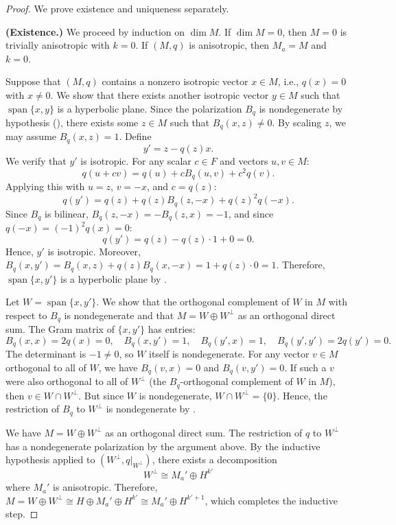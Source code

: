 \begin{proof}
    We prove existence and uniqueness separately.

    \textbf{(Existence.)} We proceed by induction on $\dim M$. If $\dim M = 0$, then $M = 0$ is trivially anisotropic with $k = 0$. If $(M, q)$ is anisotropic, then $M_a = M$ and $k = 0$.

    Suppose that $(M, q)$ contains a nonzero isotropic vector $x \in M$, i.e., $q(x) = 0$ with $x \neq 0$. We show that there exists another isotropic vector $y \in M$ such that $\operatorname{span}\{x, y\}$ is a hyperbolic plane. Since the polarization $B_q$ is nondegenerate by hypothesis (), there exists some $z \in M$ such that $B_q(x, z) \neq 0$. By scaling $z$, we may assume $B_q(x, z) = 1$. Define
    $$y' = z - q(z)x.$$
    We verify that $y'$ is isotropic. For any scalar $c \in F$ and vectors $u, v \in M$:
    $$q(u + cv) = q(u) + c B_q(u,v) + c^2 q(v).$$
    Applying this with $u = z$, $v = -x$, and $c = q(z)$:
    $$q(y') = q(z) + q(z) B_q(z, -x) + q(z)^2 q(-x).$$
    Since $B_q$ is bilinear, $B_q(z, -x) = -B_q(z, x) = -1$, and since $q(-x) = (-1)^2 q(x) = 0$:
    $$q(y') = q(z) - q(z) \cdot 1 + 0 = 0.$$
    Hence, $y'$ is isotropic. Moreover, $B_q(x, y') = B_q(x, z) + q(z) B_q(x, -x) = 1 + q(z) \cdot 0 = 1$. Therefore, $\operatorname{span}\{x, y'\}$ is a hyperbolic plane by .

    Let $W = \operatorname{span}\{x, y'\}$. We show that the orthogonal complement of $W$ in $M$ with respect to $B_q$ is nondegenerate and that $M = W \oplus W^{\perp}$ as an orthogonal direct sum. The Gram matrix of $\{x, y'\}$ has entries:
    $$B_q(x, x) = 2q(x) = 0, \quad B_q(x, y') = 1, \quad B_q(y', x) = 1, \quad B_q(y', y') = 2q(y') = 0.$$
    The determinant is $-1 \neq 0$, so $W$ itself is nondegenerate. For any vector $v \in M$ orthogonal to all of $W$, we have $B_q(v, x) = 0$ and $B_q(v, y') = 0$. If such a $v$ were also orthogonal to all of $W^{\perp}$ (the $B_q$-orthogonal complement of $W$ in $M$), then $v \in W \cap W^{\perp}$. But since $W$ is nondegenerate, $W \cap W^{\perp} = \{0\}$. Hence, the restriction of $B_q$ to $W^{\perp}$ is nondegenerate by .

    We have $M = W \oplus W^{\perp}$ as an orthogonal direct sum. The restriction of $q$ to $W^{\perp}$ has a nondegenerate polarization by the argument above. By the inductive hypothesis applied to $(W^{\perp}, q|_{W^{\perp}})$, there exists a decomposition
    $$W^{\perp} \cong M_a' \oplus H^{k'}$$
    where $M_a'$ is anisotropic. Therefore, $M = W \oplus W^{\perp} \cong H \oplus M_a' \oplus H^{k'} \cong M_a' \oplus H^{k'+1}$, which completes the inductive step.


\end{proof}
